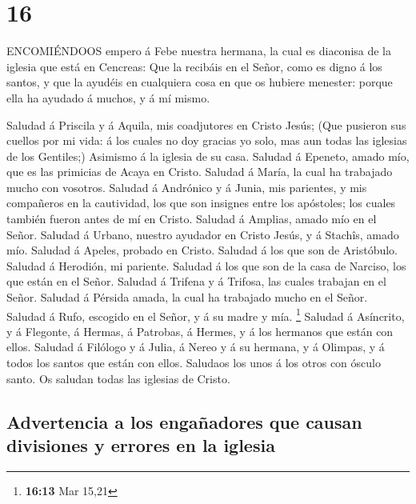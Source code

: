 \hypertarget{section-15}{%
\section{16}\label{section-15}}

 ENCOMIÉNDOOS empero á Febe nuestra hermana, la cual es
diaconisa de la iglesia que está en Cencreas:  Que la
recibáis en el Señor, como es digno á los santos, y que la ayudéis en
cualquiera cosa en que os hubiere menester: porque ella ha ayudado á
muchos, y á mí mismo.

 Saludad á Priscila y á Aquila, mis coadjutores en Cristo
Jesús;  (Que pusieron sus cuellos por mi vida: á los cuales
no doy gracias yo solo, mas aun todas las iglesias de los Gentiles;)
 Asimismo á la iglesia de su casa. Saludad á Epeneto, amado
mío, que es las primicias de Acaya en Cristo.  Saludad á
María, la cual ha trabajado mucho con vosotros.  Saludad á
Andrónico y á Junia, mis parientes, y mis compañeros en la cautividad,
los que son insignes entre los apóstoles; los cuales también fueron
antes de mí en Cristo.  Saludad á Amplias, amado mío en el
Señor.  Saludad á Urbano, nuestro ayudador en Cristo Jesús,
y á Stachîs, amado mío.  Saludad á Apeles, probado en
Cristo. Saludad á los que son de Aristóbulo.  Saludad á
Herodión, mi pariente. Saludad á los que son de la casa de Narciso, los
que están en el Señor.  Saludad á Trifena y á Trifosa, las
cuales trabajan en el Señor. Saludad á Pérsida amada, la cual ha
trabajado mucho en el Señor.  Saludad á Rufo, escogido en
el Señor, y á su madre y mía. \footnote{\textbf{16:13} Mar 15,21}
 Saludad á Asíncrito, y á Flegonte, á Hermas, á Patrobas, á
Hermes, y á los hermanos que están con ellos.  Saludad á
Filólogo y á Julia, á Nereo y á su hermana, y á Olimpas, y á todos los
santos que están con ellos.  Saludaos los unos á los otros
con ósculo santo. Os saludan todas las iglesias de Cristo.

\hypertarget{advertencia-a-los-engauxf1adores-que-causan-divisiones-y-errores-en-la-iglesia}{%
\subsection{Advertencia a los engañadores que causan divisiones y
errores en la
iglesia}\label{advertencia-a-los-engauxf1adores-que-causan-divisiones-y-errores-en-la-iglesia}}

